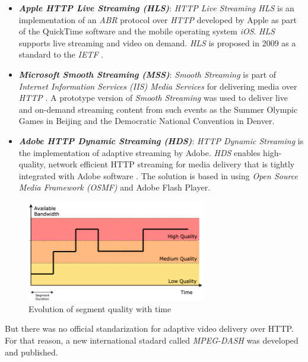 \begin{itemize}[topsep=0.5pt]
  \setlength\itemsep{0.5pt}
  \item \textbf{\textit{Apple HTTP Live Streaming (HLS)}}: \textit{HTTP Live Streaming HLS}
  is an implementation of an \textit{ABR} protocol over \textit{HTTP} developed by Apple \cite{hls1}
  as part of the QuickTime software and the mobile operating system \textit{iOS}. \textit{HLS} 
  supports live streaming and video on demand. \textit{HLS} is proposed in 2009 as a standard to
  the \textit{IETF} \cite{hls2}.
  \item \textbf{\textit{Microsoft Smooth Streaming (MSS)}}: \textit{Smooth Streaming} is part
  of \textit{Internet Information Services (IIS) Media Services} for delivering media over
  \textit{HTTP} \cite{mss1}. A prototype version of \textit{Smooth Streaming}
  was used to deliver live and on-demand streaming content from such events as the Summer Olympic
  Games in Beijing and the Democratic National Convention in Denver.
  \item \textbf{\textit{Adobe HTTP Dynamic Streaming (HDS)}}: \textit{HTTP Dynamic Streaming}
  is the implementation of adaptive streaming by Adobe. \textit{HDS} enables high-quality, network
  efficient HTTP streaming for media delivery that is tightly integrated with Adobe software \cite{hds1}. The
  solution is based in using \textit{Open Source Media Framework (OSMF)} and Adobe Flash Player.
\end{itemize}

\begin{figure}[h]
  \centering
  \includegraphics[width=0.7\textwidth]{img/abrtime.png}
  \caption{Evolution of segment quality with time}
  \label{fig:abrtime}

\end{figure}

But there was no official standarization for adaptive video delivery over HTTP. For that reason,
a new international stadard called \textit{MPEG-DASH} was developed and published.

